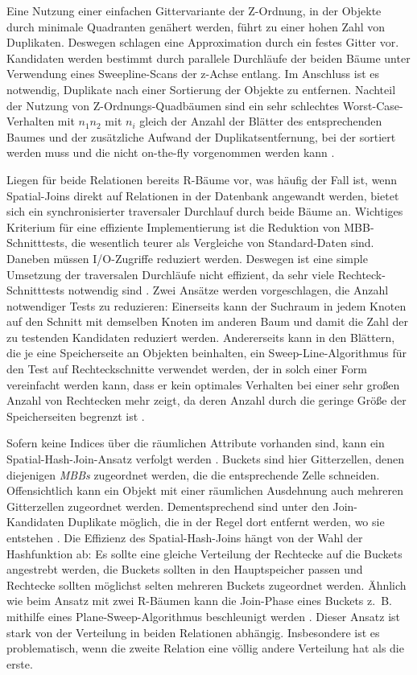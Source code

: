 \documentclass[a4paper,12pt,twoside]{article}
\newcommand{\Fb}[1]{\textit{#1}} %
\begin{document}
Eine Nutzung einer einfachen Gittervariante der Z-Ordnung, in der Objekte durch minimale Quadranten genähert werden, führt zu einer hohen Zahl von Duplikaten. Deswegen schlagen {\textcite[S. 280f]{Rigaux2001}} eine Approximation durch ein festes Gitter vor. Kandidaten werden bestimmt durch parallele Durchläufe der beiden Bäume unter Verwendung eines Sweepline-Scans der z-Achse entlang. Im Anschluss ist es notwendig, Duplikate nach einer Sortierung der Objekte zu entfernen. Nachteil der Nutzung von Z-Ordnungs-Quadbäumen sind ein sehr schlechtes Worst-Case-Verhalten mit $n_1 n_2$ mit $n_i$ gleich der Anzahl der Blätter des entsprechenden Baumes und der zusätzliche Aufwand der Duplikatsentfernung, bei der sortiert werden muss und die nicht on-the-fly vorgenommen werden kann \parencite[S. 284]{Rigaux2001}. 

Liegen für beide Relationen bereits R-Bäume vor, was häufig der Fall ist, wenn Spatial-Joins direkt auf Relationen in der Datenbank angewandt werden, bietet sich ein synchronisierter traversaler Durchlauf durch beide Bäume an. Wichtiges Kriterium für eine effiziente Implementierung ist die Reduktion von MBB-Schnitttests, die wesentlich teurer als Vergleiche von Standard-Daten sind. Daneben müssen I/O-Zugriffe reduziert werden. Deswegen ist eine simple Umsetzung der traversalen Durchläufe nicht effizient, da sehr viele Rechteck-Schnitttests notwendig sind \parencite[S. 284f]{Rigaux2001}. Zwei Ansätze werden vorgeschlagen, die Anzahl notwendiger Tests zu reduzieren: Einerseits kann der Suchraum in jedem Knoten auf den Schnitt mit demselben Knoten im anderen Baum und damit die Zahl der zu testenden Kandidaten reduziert werden. Andererseits kann in den Blättern, die je eine Speicherseite an Objekten beinhalten, ein Sweep-Line-Algorithmus für den Test auf Rechteckschnitte verwendet werden, der in solch einer Form vereinfacht werden kann, dass er kein optimales Verhalten bei einer sehr großen Anzahl von Rechtecken mehr zeigt, da deren Anzahl durch die geringe Größe der Speicherseiten begrenzt ist \parencite[S. 286f]{Rigaux2001}. 

Sofern keine Indices über die räumlichen Attribute vorhanden sind, kann ein Spatial-Hash-Join-Ansatz verfolgt werden \parencite[S. 288]{Rigaux2001}. Buckets sind hier Gitterzellen, denen diejenigen \Fb{MBBs} zugeordnet werden, die die entsprechende Zelle schneiden. Offensichtlich kann ein Objekt mit einer räumlichen Ausdehnung auch mehreren Gitterzellen zugeordnet werden. Dementsprechend sind unter den Join-Kandidaten Duplikate möglich, die in der Regel dort entfernt werden, wo sie entstehen \parencite{Zhou1998, Luo2002}. Die Effizienz des Spatial-Hash-Joins hängt von der Wahl der Hashfunktion ab: Es sollte eine gleiche Verteilung der Rechtecke auf die Buckets angestrebt werden, die Buckets sollten in den Hauptspeicher passen und Rechtecke sollten möglichst selten mehreren Buckets zugeordnet werden. Ähnlich wie beim Ansatz mit zwei R-Bäumen kann die Join-Phase eines Buckets z.~B. mithilfe eines Plane-Sweep-Algorithmus beschleunigt werden \parencite[S. 290]{Rigaux2001}. Dieser Ansatz ist stark von der Verteilung in beiden Relationen abhängig. Insbesondere ist es problematisch, wenn die zweite Relation eine völlig andere Verteilung hat als die erste.
\end{document}
